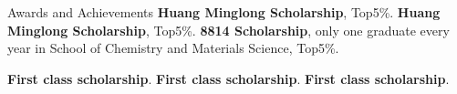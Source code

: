 
\begin{rubric}{Awards and Achievements}
\entry*[2014-15] \textbf{Huang Minglong Scholarship}, Top5\%.
%
\entry*[2015-16] \textbf{Huang Minglong Scholarship}, Top5\%.
\entry*[2016-17] \textbf{8814 Scholarship}, only one graduate every year in  School of Chemistry and Materials Science, Top5\%.

\entry*[2018] \textbf{First class scholarship}.
\entry*[2019] \textbf{First class scholarship}.
\entry*[2020] \textbf{First class scholarship}.
\end{rubric}
